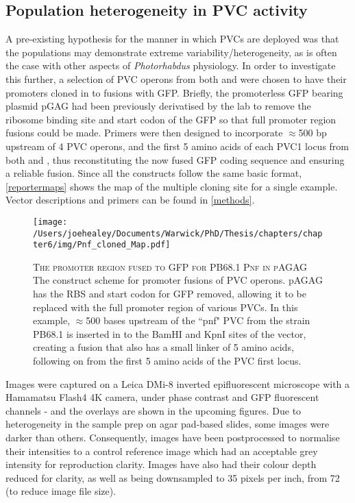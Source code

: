\subsection{Population heterogeneity in PVC activity}\label{heterogeneity}
A pre-existing hypothesis for the manner in which PVCs are deployed was that the populations may demonstrate extreme variability/heterogeneity, as is often the case with other aspects of \emph{Photorhabdus} physiology. In order to investigate this further, a selection of PVC operons from both \Plum{} and \Pasy{} were chosen to have their promoters cloned in to fusions with GFP. Briefly, the promoterless GFP bearing plasmid pGAG had been previously derivatised by the lab to remove the ribosome binding site and start codon of the GFP so that full promoter region fusions could be made. Primers were then designed to incorporate $\approx$500 bp upstream of 4 PVC operons, and the first 5 amino acids of each PVC1 locus from both \Plum{} and \Pasy, thus reconstituting the now fused GFP coding sequence and ensuring a reliable fusion. Since all the constructs follow the same basic format, \vref{reportermaps} shows the map of the multiple cloning site for a single example. Vector descriptions and primers can be found in \vref{methods}.


\begin{figure}[h]
    \texttt{[image: /Users/joehealey/Documents/Warwick/PhD/Thesis/chapters/chapter6/img/Pnf\_cloned\_Map.pdf]}
    \captionsetup{singlelinecheck=off, justification=justified, font=footnotesize, aboveskip=10pt}
    \caption[Example of promoter fusions for PVC operons]{\textsc{\normalsize The promoter region fused to GFP for \Pasy{} PB68.1 Pnf in pAGAG} \vspace{0.1cm} \newline The construct scheme for promoter fusions of PVC operons. pAGAG has the RBS and start codon for GFP removed, allowing it to be replaced with the full promoter region of various PVCs. In this example, $\approx$500 bases upstream of the ``pnf" PVC from the \Pasy{} strain PB68.1 is inserted in to the BamHI and KpnI sites of the vector, creating a fusion that also has a small linker of 5 amino acids, following on from the first 5 amino acids of the PVC first locus.}
\label{reportermaps}
\end{figure}




Images were captured on a Leica DMi-8 inverted epifluorescent microscope with a Hamamatsu Flash4 4K camera, under phase contrast and GFP fluorescent channels - and the overlays are shown in the upcoming figures. Due to heterogeneity in the sample prep on agar pad-based slides, some images were darker than others. Consequently, images have been postprocessed to normalise their intensities to a control reference image which had an acceptable grey intensity for reproduction clarity. Images have also had their colour depth reduced for clarity, as well as being downsampled to 35 pixels per inch, from 72 (to reduce image file size).

